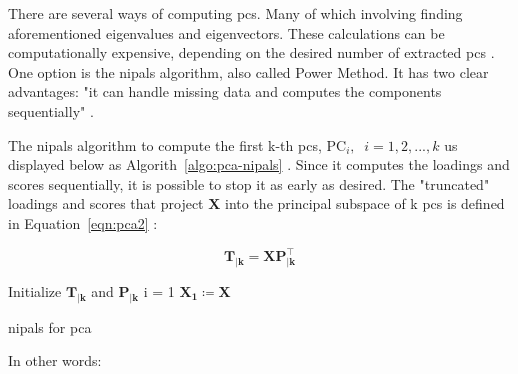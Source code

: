 There are several ways of computing \acrshort{pc}s. Many of which involving finding aforementioned eigenvalues and eigenvectors. These calculations can be computationally expensive, depending on the desired number of extracted \acrshort{pc}s \parencite{bishop2006pattern}. One option is the \acrfull{nipals} algorithm, also called Power Method. It has two clear advantages: "it can handle missing data and computes the components sequentially" \parencite{dunn2021pid}.

The \acrshort{nipals} algorithm to compute the first k-th \acrshort{pc}s, $\text{PC}_i ,\;\; i =1,2,...,k$ us displayed below as Algorith~\ref{algo:pca-nipals} \parencite{dunn2021pid} \parencite{ng2013} \parencite{nipals2017}. Since it computes the loadings and scores sequentially, it is possible to stop it as early as desired. The "truncated" loadings and scores that project $\mathbf{X}$ into the principal subspace of k \acrshort{pc}s is defined in Equation~\ref{eqn:pca2} :

\begin{equation}
	\label{eqn:pca2}
	\mathbf{T_{|k}=XP_{|k}^\intercal}
\end{equation}

\begin{algorithm}[H]
	\DontPrintSemicolon
	\label{algo:pca-nipals}
	\SetAlgoLined
	Initialize $\mathbf{T_{|k}}$ and $\mathbf{P_{|k}}$\;
	i = 1\;
	$\mathbf{X_1 \coloneqq X}$\;
	
	
	\caption{\acrfull{nipals} for \acrshort{pca}}
\end{algorithm}

In other words:

